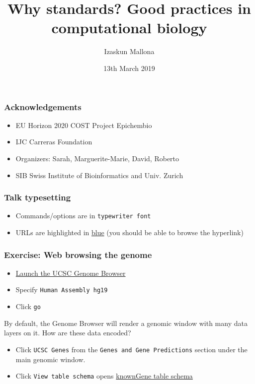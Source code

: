 \documentclass{beamer}
\title{Why standards? Good practices in computational biology}
\institute{COST Project Epichembio - Introduction to NGS data analysis}
\author[izaskun.mallona@sib.swiss]{Izaskun Mallona}
\date{13th March 2019}
\begin{document}
\begin{frame}
  \titlepage
\end{frame}


\begin{frame}
  \frametitle{Acknowledgements}
  \begin{itemize}
  \item EU Horizon 2020 COST Project Epichembio 
  \item IJC Carreras Foundation
  \item Organizers: Sarah, Marguerite-Marie, David, Roberto
  \item SIB Swiss Institute of Bioinformatics and Univ. Zurich
  \end{itemize}
\end{frame}




\begin{frame}
  \frametitle{Talk typesetting}
  \begin{itemize}
  \item Commands/options are in \texttt{typewriter font}
  \item URLs are highlighted in \href{https://genome-euro.ucsc.edu/cgi-bin/hgGateway}{blue} (you should be able to browse the hyperlink)
  \end{itemize}
\end{frame}


\begin{frame}
  \frametitle{Exercise: Web browsing the genome}
  \begin{itemize}
  \item \href{https://genome-euro.ucsc.edu/cgi-bin/hgGateway}{Launch the UCSC Genome Browser}
  \item  Specify \texttt{Human Assembly hg19}    
  \item Click \texttt{go}
  \end{itemize}

  By default, the Genome Browser will render a genomic window with many data layers on it. How are these data encoded?

  \begin{itemize}
  \item Click \texttt{UCSC Genes} from the \texttt{Genes and Gene Predictions} section under the main genomic window.
  \item  Click \texttt{View table schema} opens \href{https://genome-euro.ucsc.edu/cgi-bin/hgTables?db=hg19&hgta_group=genes&hgta_track=knownGene&hgta_table=knownGene&hgta_doSchema=describe+table+schema}{knownGene table schema}
    \end{itemize}

  \end{frame}
\end{document}
